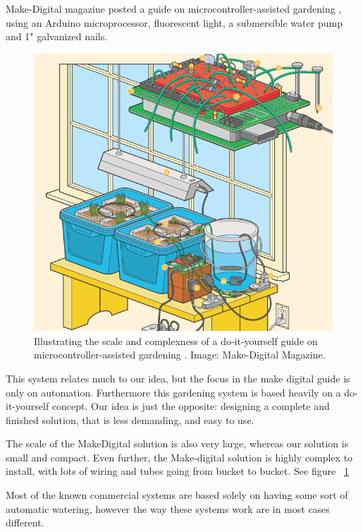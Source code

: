 \documentclass{ubicomp2012}
\begin{document}
Make-Digital magazine posted a guide on microcontroller-assisted gardening \cite{how-to-make-a-gardening-system}, using an Arduino microprocessor, fluorescent light, a submersible water pump and 1" galvanized nails.

\begin{figure}[h!]
\centering
\includegraphics[width=\columnwidth]{howto-gardening.png}
\caption{Illustrating the scale and complexness of a do-it-yourself guide on microcontroller-assisted gardening \cite{how-to-make-a-gardening-system}. Image: Make-Digital Magazine.}
\label{fig:MakeDigitalMagazine}
\end{figure}

This system relates much to our idea, but the focus in the make digital guide is only on automation. Furthermore this gardening system is based heavily on a do-it-yourself concept. Our idea is just the opposite: designing a complete and finished solution, that is less demanding, and easy to use.

The scale of the MakeDigital solution is also very large, whereas our solution is small and compact. Even further, the Make-digital solution is highly complex to install, with lots of wiring and tubes going from bucket to bucket. See figure ~\ref{fig:MakeDigitalMagazine}

Most of the known commercial systems are based solely on having some sort of automatic watering, however the way these systems work are in most cases different.
\end{document}

